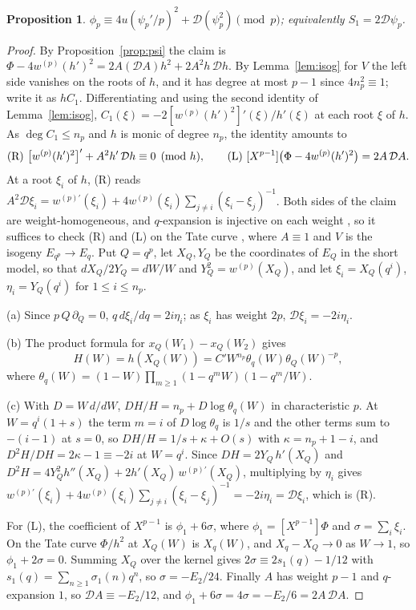 \documentclass[11pt,a4paper]{amsart}
\theoremstyle{plain}
\newtheorem{proposition}[theorem]{Proposition}
\theoremstyle{definition}
\theoremstyle{remark}
\begin{document}
\begin{proposition}\label{prop:S1}
$\phi_p\equiv4u(\psi_p'/p)^2+\mathcal D(\psi_p^2)\pmod p$; equivalently $S_1=2\mathcal D\psi_p$.
\end{proposition}

\begin{proof}
By Proposition~\ref{prop:psi} the claim is $\Phi-4w^{(p)}(h')^2=2A(\mathcal DA)h^2+2A^2h\,\mathcal Dh$. By Lemma~\ref{lem:isog} for $V$ the left side vanishes on the roots of $h$, and it has degree at most $p-1$ since $4n_p^2\equiv1$; write it as $hC_1$. Differentiating and using the second identity of Lemma~\ref{lem:isog}, $C_1(\xi)=-2[w^{(p)}(h')^2]'(\xi)/h'(\xi)$ at each root $\xi$ of $h$. As $\deg C_1\le n_p$ and $h$ is monic of degree $n_p$, the identity amounts to
\[
\textup{(R)}\ \bigl[w^{(p)}(h')^2\bigr]'+A^2h'\,\mathcal Dh\equiv0\pmod h,\qquad \textup{(L)}\ [X^{p-1}]\bigl(\Phi-4w^{(p)}(h')^2\bigr)=2A\,\mathcal DA .
\]
At a root $\xi_i$ of $h$, (R) reads $A^2\mathcal D\xi_i=w^{(p)\prime}(\xi_i)+4w^{(p)}(\xi_i)\sum_{j\ne i}(\xi_i-\xi_j)^{-1}$. Both sides of the claim are weight-homogeneous, and $q$-expansion is injective on each weight \cite{Ser73,SwD73}, so it suffices to check (R) and (L) on the Tate curve \cite[Ch.~V]{ATAEC}, where $A\equiv1$ and $V$ is the isogeny $E_{q^p}\to E_q$. Put $Q=q^p$, let $X_Q,Y_Q$ be the coordinates of $E_Q$ in the short model, so that $dX_Q/2Y_Q=dW/W$ and $Y_Q^2=w^{(p)}(X_Q)$, and let $\xi_i=X_Q(q^i)$, $\eta_i=Y_Q(q^i)$ for $1\le i\le n_p$.

(a) Since $p\,Q\,\partial_Q=0$, $q\,d\xi_i/dq=2i\eta_i$; as $\xi_i$ has weight $2p$, $\mathcal D\xi_i=-2i\eta_i$.

(b) The product formula for $x_Q(W_1)-x_Q(W_2)$ gives
\[
H(W)=h(X_Q(W))=C'W^{n_p}\theta_q(W)\theta_Q(W)^{-p},
\]
where $\theta_q(W)=(1-W)\prod_{m\ge1}(1-q^mW)(1-q^m/W)$.

(c) With $D=W\,d/dW$, $DH/H=n_p+D\log\theta_q(W)$ in characteristic $p$. At $W=q^i(1+s)$ the term $m=i$ of $D\log\theta_q$ is $1/s$ and the other terms sum to $-(i-1)$ at $s=0$, so $DH/H=1/s+\kappa+O(s)$ with $\kappa=n_p+1-i$, and $D^2H/DH=2\kappa-1\equiv-2i$ at $W=q^i$. Since $DH=2Y_Q\,h'(X_Q)$ and $D^2H=4Y_Q^2h''(X_Q)+2h'(X_Q)\,w^{(p)\prime}(X_Q)$, multiplying by $\eta_i$ gives $w^{(p)\prime}(\xi_i)+4w^{(p)}(\xi_i)\sum_{j\ne i}(\xi_i-\xi_j)^{-1}=-2i\eta_i=\mathcal D\xi_i$, which is (R).

For (L), the coefficient of $X^{p-1}$ is $\phi_1+6\sigma$, where $\phi_1=[X^{p-1}]\Phi$ and $\sigma=\sum_i\xi_i$. On the Tate curve $\Phi/h^2$ at $X_Q(W)$ is $X_q(W)$, and $X_q-X_Q\to0$ as $W\to1$, so $\phi_1+2\sigma=0$. Summing $X_Q$ over the kernel gives $2\sigma\equiv2s_1(q)-1/12$ with $s_1(q)=\sum_{n\ge1}\sigma_1(n)q^n$, so $\sigma=-E_2/24$. Finally $A$ has weight $p-1$ and $q$-expansion $1$, so $\mathcal DA\equiv-E_2/12$, and $\phi_1+6\sigma=4\sigma=-E_2/6=2A\,\mathcal DA$.
\end{proof}
\end{document}
